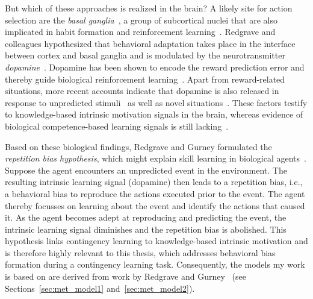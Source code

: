 \documentclass[a4paper]{scrreprt}
\begin{document}
But which of these approaches is realized in the brain? A likely site for action selection are the \textit{basal ganglia}~\cite{mink96,redgrave07}, a group of subcortical nuclei that are also implicated in habit formation and reinforcement learning~\cite{barto95,doya00,houk95,joel02}. Redgrave and colleagues hypothesized that behavioral adaptation takes place in the interface between cortex and basal ganglia and is modulated by the neurotransmitter \textit{dopamine}~\cite{redgrave11}. Dopamine has been shown to encode the reward prediction error and thereby guide biological reinforcement learning~\cite{schultz97,houk95,schultz00}. Apart from reward-related situations, more recent accounts indicate that dopamine is also released in response to unpredicted stimuli~\cite{dommett05,horvitz00} as well as novel situations~\cite{lisman05,otmakova12}. These factors testify to knowledge-based intrinsic motivation signals in the brain, whereas evidence of biological competence-based learning signals is still lacking~\cite{mirolli13}.

Based on these biological findings, Redgrave and Gurney formulated the \textit{repetition bias hypothesis}, which might explain skill learning in biological agents~\cite{redgrave06,gurney12,redgrave12}. Suppose the agent encounters an unpredicted event in the environment. The resulting intrinsic learning signal (dopamine) then leads to a repetition bias, i.e., a behavioral bias to reproduce the actions executed prior to the event. The agent thereby focusses on learning about the event and identify the actions that caused it. As the agent becomes adept at reproducing and predicting the event, the intrinsic learning signal diminishes and the repetition bias is abolished. This hypothesis links contingency learning to knowledge-based intrinsic motivation and is therefore highly relevant to this thesis, which addresses behavioral bias formation during a contingency learning task. Consequently, the models my work is based on are derived from work by Redgrave and Gurney~\cite{bg13} (see Sections~\ref{sec:met_model1} and~\ref{sec:met_model2}).
\end{document}
